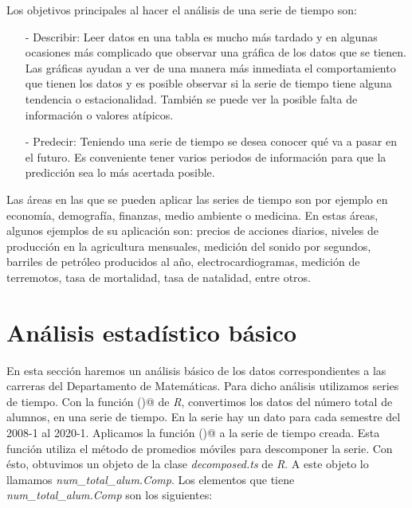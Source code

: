 Los objetivos principales al hacer el análisis de una serie de tiempo son:
  
  \begin{itemize}
\item[-] Describir: Leer datos en una tabla es mucho más tardado y en algunas ocasiones más complicado que observar una gráfica de los datos que se tienen. Las gráficas ayudan a ver de una manera más inmediata el comportamiento que tienen los datos y es posible observar si la serie de tiempo tiene alguna tendencia o estacionalidad. También se puede ver la posible falta de información o valores atípicos.

\item[-] Predecir: Teniendo una serie de tiempo se desea conocer qué va a pasar en el futuro. Es conveniente tener varios periodos de información para que la predicción sea lo más acertada posible.
\end{itemize}

Las áreas en las que se pueden aplicar las series de tiempo son por ejemplo en economía, demografía, finanzas, medio ambiente o medicina. En estas áreas, algunos ejemplos de su aplicación son: precios de acciones diarios, niveles de producción en la agricultura mensuales, medición del sonido por segundos, barriles de petróleo producidos al año, electrocardiogramas, medición de terremotos, tasa de mortalidad, tasa de natalidad, entre otros.


\section{Análisis estadístico básico}

En esta sección haremos un análisis básico de los datos correspondientes a las carreras del Departamento de Matemáticas. Para dicho análisis utilizamos series de tiempo. Con la función \verb@ts()@ de \textit{R}, convertimos los datos del número total de alumnos, en una serie de tiempo. En la serie hay un dato para cada semestre del 2008-1 al 2020-1. Aplicamos la función \verb@decompose()@ a la serie de tiempo creada. Esta función utiliza el método de promedios móviles para descomponer la serie. Con ésto, obtuvimos un objeto de la clase \textit{decomposed.ts} de \textit{R}. A este objeto lo llamamos \textit{num\_total\_alum.Comp}. Los elementos que tiene \textit{num\_total\_alum.Comp} son los siguientes:

